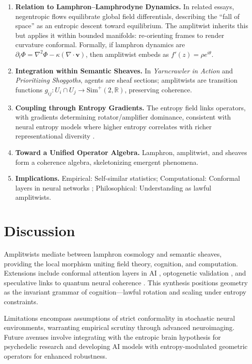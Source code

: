 \documentclass[11pt]{article}
\begin{document}
\begin{enumerate}
\item \textbf{Relation to Lamphron--Lamphrodyne Dynamics.} In related essays, negentropic flows equilibrate global field differentials, describing the ``fall of space'' as an entropic descent toward equilibrium. The amplitwist inherits this but applies it within bounded manifolds: re-orienting frames to render curvature conformal. Formally, if lamphron dynamics are $\partial_t \Phi = \nabla^2 \Phi - \kappa (\nabla \cdot \mathbf{v})$, then amplitwist embeds as $f'(z) = \rho e^{i\theta}$.
\item \textbf{Integration within Semantic Sheaves.} In \emph{Yarncrawler in Action} and \emph{Prioritizing Shoggoths}, agents are sheaf sections; amplitwists are transition functions $g_{ij}: U_i \cap U_j \to \mathrm{Sim}^+(2,\mathbb{R})$, preserving coherence.
\item \textbf{Coupling through Entropy Gradients.} The entropy field links operators, with gradients determining rotator/amplifier dominance, consistent with neural entropy models where higher entropy correlates with richer representational diversity \citep{carhart2014entropic}.
\item \textbf{Toward a Unified Operator Algebra.} Lamphron, amplitwist, and sheaves form a coherence algebra, skeletonizing emergent phenomena.
\item \textbf{Implications.} Empirical: Self-similar statistics; Computational: Conformal layers in neural networks \citep{cohen2016group}; Philosophical: Understanding as lawful amplitwists.
\end{enumerate}

\section{Discussion}
Amplitwists mediate between lamphron cosmology and semantic sheaves, providing the local morphism uniting field theory, cognition, and computation. Extensions include conformal attention layers in AI \citep{cohen2016group}, optogenetic validation \citep{boyden2011optogenetics}, and speculative links to quantum neural coherence \citep{hameroff1996orchestrated}. This synthesis positions geometry as the invariant grammar of cognition—lawful rotation and scaling under entropy constraints.

Limitations encompass assumptions of strict conformality in stochastic neural environments, warranting empirical scrutiny through advanced neuroimaging. Future avenues involve integrating with the entropic brain hypothesis for psychedelic research \citep{carhart2014entropic} and developing AI models with entropy-modulated geometric operators for enhanced robustness.
\end{document}
